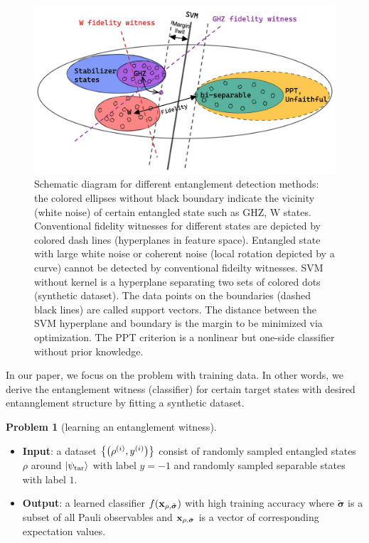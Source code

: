 \documentclass[
aps,
pra,
twocolumn,
floatfix,
]{revtex4-2}
\theoremstyle{plain}
\theoremstyle{definition}
\newtheorem{problem}{Problem}
\newcommand{\dm}{\rho}
\newcommand{\target}{\textup{tar}}
\newcommand{\bmsigma}{\bm{\sigma}}
\begin{document}
\begin{figure}[!ht]
	\centering
		\centering
		\includegraphics[width=.6\linewidth]{schematic.png}
	\caption{Schematic diagram for different entanglement detection methods: the colored ellipses without black boundary indicate the vicinity (white noise) of certain entangled state such as GHZ, W states. Conventional fidelity witnesses for different states are depicted by colored dash lines (hyperplanes in feature space). Entangled state with large white noise or coherent noise (local rotation depicted by a curve) cannot be detected by conventional fideilty witnesses. SVM without kernel is a hyperplane separating two sets of colored dots (synthetic dataset). The data points on the boundaries (dashed black lines) are called support vectors. The distance between the SVM hyperplane and boundary is the margin to be minimized via optimization. The PPT criterion is a nonlinear but one-side classifier without prior knowledge.}
	\label{fig:entangle}
\end{figure}

In our paper, we focus on the  problem with training data.
In other words, we derive the entanglement witness (classifier) for certain target states with desired entannglement structure by fitting a synthetic dataset.
\begin{problem}[learning an entanglement witness]\label{prm:learn_witness}
	\;
	\begin{itemize}
		\item \textbf{Input}: a dataset $\qty{\qty(\dm^{(i)},y^{(i)})}$ consist of randomly sampled entangled states $\dm$ around $\ket{\psi_{\target}}$ with label $y=-1$ and randomly sampled separable states with label $1$.
		\item \textbf{Output}: a learned classifier $f(\vbx_{\dm,\tilde{\bmsigma}})$ with high training accuracy where $\tilde{\bmsigma}$ is a subset of all Pauli observables and $\vbx_{\dm,\tilde{\bmsigma}}$ is a vector of corresponding expectation values.
	\end{itemize}
\end{problem}
\end{document}
